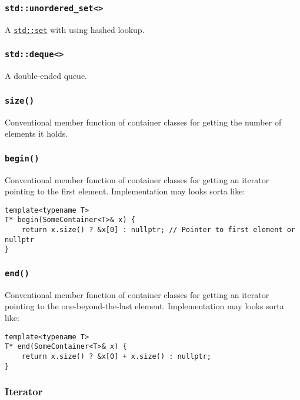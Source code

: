 \documentclass[8pt, table, xcdraw]{article}%
\begin{document}
\subsubsection{\lstinline{std::unordered_set<>}} \label{std_unordered_set}

A \hyperref[std_set]{\lstinline{std::set}} with using hashed lookup.

\subsubsection{\lstinline{std::deque<>}} \label{std_deque}

A double-ended queue.

\subsubsection{\lstinline{size()}}

Conventional member function of container classes for getting the number of elements it holds.

\subsubsection{\lstinline{begin()}} \label{begin}

Conventional member function of container classes for getting an iterator pointing to the first element. Implementation may looks sorta like:

\begin{lstlisting}
template<typename T>
T* begin(SomeContainer<T>& x) {
    return x.size() ? &x[0] : nullptr; // Pointer to first element or nullptr
}
\end{lstlisting}

\subsubsection{\lstinline{end()}}

Conventional member function of container classes for getting an iterator pointing to the one-beyond-the-last element. Implementation may looks sorta like:

\begin{lstlisting}
template<typename T>
T* end(SomeContainer<T>& x) {
    return x.size() ? &x[0] + x.size() : nullptr;
}
\end{lstlisting}

\subsubsection{Iterator}
\end{document}
